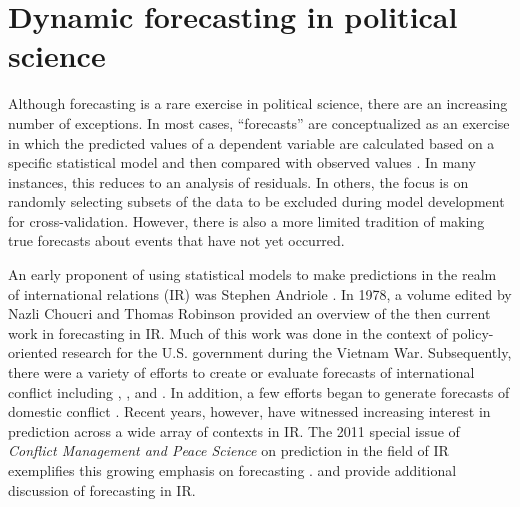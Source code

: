 \section{Dynamic forecasting in political science}
Although forecasting is a rare exercise in political science, there
are an increasing number of exceptions.  In most cases, ``forecasts''
are conceptualized as an exercise in which the predicted values of a
dependent variable are calculated based on a specific statistical
model and then compared with observed values
\citep[e.g.,][]{Hildebrand:etal:1976}. In many instances, this reduces
to an analysis of residuals.  In others, the focus is on randomly
selecting subsets of the data to be excluded during model development
for cross-validation.  However, there is also a more limited tradition
of making true forecasts about events that have not yet occurred.

An early proponent of using statistical models to make predictions in
the realm of international relations (IR) was Stephen Andriole
\citep{Andriole:Young:1977}. In 1978, a volume edited by Nazli Choucri
and Thomas Robinson \nocite{Choucri:Robinson:1978} provided an
overview of the then current work in forecasting in IR.  Much of this
work was done in the context of policy-oriented research for the
U.S. government during the Vietnam War.  Subsequently, there were a
variety of efforts to create or evaluate forecasts of international
conflict including \citet{Freeman:Job:1979},
\citet{Singer:Wallace:1979}, and \citet{Vincent:1980}.  In addition, a
few efforts began to generate forecasts of domestic conflict
\citep[e.g.,][]{Gurr:Lichbach:1986}.  Recent years, however, have
witnessed increasing interest in prediction across a wide array of
contexts in IR.  The 2011 special issue of \emph{Conflict
  Management and Peace Science} on prediction in the field of IR
exemplifies this growing emphasis on forecasting
\citep[c.f.,][]{Schneider_etal_2011, Mesquita_2011,
  Brandt_etal_2011}. 
and
provide additional discussion of forecasting in IR.

